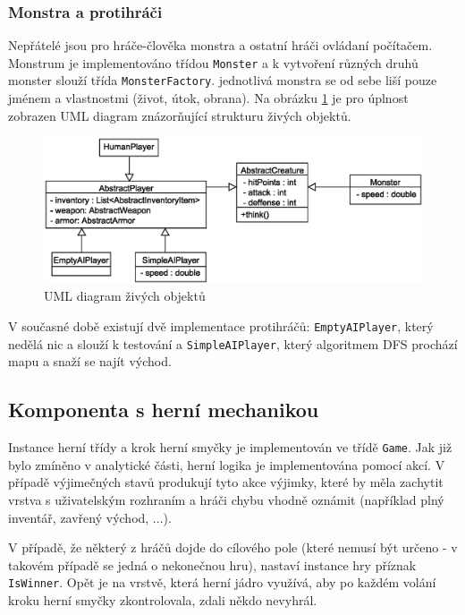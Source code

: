 \documentclass[11pt,a4paper]{scrartcl}
\begin{document}
	\subsubsection{Monstra a protihráči}
	Nepřátelé jsou pro hráče-člověka monstra a ostatní hráči ovládaní počítačem. Monstrum je implementováno třídou \verb|Monster| a k vytvoření různých druhů monster slouží třída \verb|MonsterFactory|. jednotlivá monstra se od sebe liší pouze jménem a vlastnostmi (život, útok, obrana). Na obrázku \ref{fig:core-creatures} je pro úplnost zobrazen UML diagram znázorňující strukturu živých objektů.
	
	\begin{figure}[H]
		\centering
		\includegraphics[width=140mm]{core-creatures-simple}
		\caption{UML diagram živých objektů}
		\label{fig:core-creatures}
	\end{figure}
	
	V současné době existují dvě implementace protihráčů: \verb|EmptyAIPlayer|, který nedělá nic a slouží k testování a \verb|SimpleAIPlayer|, který algoritmem DFS prochází mapu a snaží se najít východ. 
	
	\subsection{Komponenta s herní mechanikou}
	Instance herní třídy a krok herní smyčky je implementován ve třídě \verb|Game|. Jak již bylo zmíněno v analytické části, herní logika je implementována pomocí akcí. V případě výjimečných stavů produkují tyto akce výjimky, které by měla zachytit vrstva s uživatelským rozhraním a hráči chybu vhodně oznámit (například plný inventář, zavřený východ, ...).
	
	V případě, že některý z hráčů dojde do cílového pole (které nemusí být určeno - v takovém případě se jedná o nekonečnou hru), nastaví instance hry příznak \verb|IsWinner|. Opět je na vrstvě, která herní jádro využívá, aby po každém volání kroku herní smyčky zkontrolovala, zdali někdo nevyhrál.
	
\end{document}
